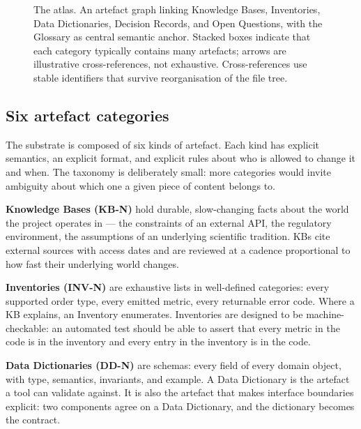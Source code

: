 \documentclass[11pt,a4paper,twocolumn]{article}
\begin{document}
\begin{figure}[t]
\caption{The atlas. An artefact graph linking Knowledge Bases,
Inventories, Data Dictionaries, Decision Records, and Open
Questions, with the Glossary as central semantic anchor. Stacked
boxes indicate that each category typically contains many
artefacts; arrows are illustrative cross-references, not
exhaustive. Cross-references use stable identifiers that survive
reorganisation of the file tree.}
\label{fig:atlas}
\end{figure}

\subsection{Six artefact categories}

The substrate is composed of six kinds of artefact. Each kind has
explicit semantics, an explicit format, and explicit rules about
who is allowed to change it and when. The taxonomy is deliberately
small: more categories would invite ambiguity about which one a
given piece of content belongs to.

\textbf{Knowledge Bases (KB-N)} hold durable, slow-changing facts
about the world the project operates in --- the constraints of an
external API, the regulatory environment, the assumptions of an
underlying scientific tradition. KBs cite external sources with
access dates and are reviewed at a cadence proportional to how
fast their underlying world changes.

\textbf{Inventories (INV-N)} are exhaustive lists in well-defined
categories: every supported order type, every emitted metric, every
returnable error code. Where a KB explains, an Inventory enumerates.
Inventories are designed to be machine-checkable: an automated test
should be able to assert that every metric in the code is in the
inventory and every entry in the inventory is in the code.

\textbf{Data Dictionaries (DD-N)} are schemas: every field of every
domain object, with type, semantics, invariants, and example. A
Data Dictionary is the artefact a tool can validate against. It is
also the artefact that makes interface boundaries explicit: two
components agree on a Data Dictionary, and the dictionary becomes
the contract.
\end{document}
